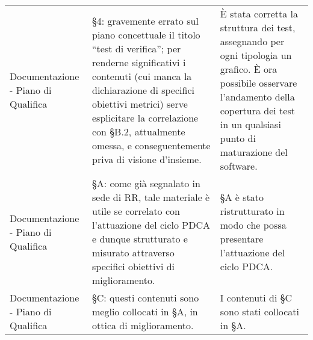 \begin{longtable}{ 
				>{\centering}p{} 
				>{\centering}p{}
				>{\centering\arraybackslash}p{}}
				Documentazione - Piano di Qualifica
					&
				§4: gravemente errato sul piano concettuale il titolo “test di verifica”; per renderne significativi i contenuti (cui manca la dichiarazione di specifici obiettivi metrici) serve esplicitare la correlazione con §B.2, attualmente omessa, e conseguentemente priva di visione d’insieme. 
					&
				È stata corretta la struttura dei test, assegnando per ogni tipologia un grafico. È ora possibile osservare l'andamento della copertura dei test in un qualsiasi punto di maturazione del software.
					\\
				
				Documentazione - Piano di Qualifica
					&
				§A: come già segnalato in sede di RR, tale materiale è utile se correlato con l’attuazione del ciclo PDCA\ped{\textit{G}} e dunque strutturato e misurato attraverso specifici obiettivi di miglioramento. 
					&
				§A è stato ristrutturato in modo che possa presentare l'attuazione del ciclo PDCA\ped{\textit{G}}.
					\\
					
				Documentazione - Piano di Qualifica
					&
				§C: questi contenuti sono meglio collocati in §A, in ottica di miglioramento. 
					&
				I contenuti di §C sono stati collocati in §A.
					\\
			\end{longtable}
			

